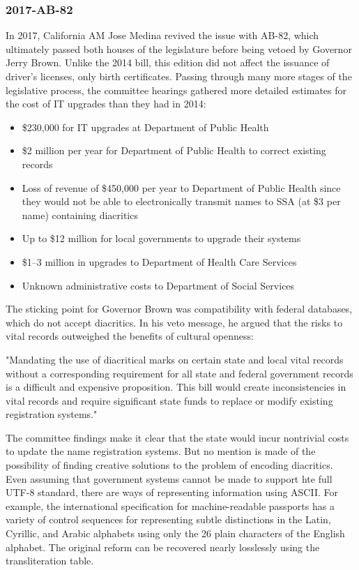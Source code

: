 \subsubsection{2017-AB-82}

In 2017, California AM Jose Medina revived the issue with AB-82, which
ultimately passed both houses of the legislature before being vetoed by
Governor Jerry Brown. Unlike the 2014 bill, this edition did not affect
the issuance of driver's licenses, only birth certificates. Passing
through many more stages of the legislative process, the committee
hearings gathered more detailed estimates for the cost of IT upgrades
than they had in 2014:

\begin{itemize}
\item
  \$230,000 for IT upgrades at Department of Public Health
\item
  \$2 million per year for Department of Public Health to correct
  existing records
\item
  Loss of revenue of \$450,000 per year to Department of Public Health
  since they would not be able to electronically transmit names to SSA
  (at \$3 per name) containing diacritics
\item
  Up to \$12 million for local governments to upgrade their systems
\item
  \$1--3 million in upgrades to Department of Health Care Services
\item
  Unknown administrative costs to Department of Social Services
\end{itemize}

The sticking point for Governor Brown was compatibility with federal databases,
which do not accept diacritics. In his veto message, he argued that the risks to
vital records outweighed the benefits of cultural openness:

"Mandating the use of diacritical marks on certain state and local vital records
without a corresponding requirement for all state and federal government records
is a difficult and expensive proposition.  This bill would create
inconsistencies in vital records and require significant state funds to replace
or modify existing registration systems."

The committee findings make it clear that the state would incur nontrivial costs
to update the name registration systems. But no mention is made of the
possibility of finding creative solutions to the problem of encoding diacritics.
Even assuming that government systems cannot be made to support hte full UTF-8
standard, there are ways of representing information using ASCII. For example,
the international specification for machine-readable passports has a variety of
control sequences for representing subtle distinctions in the Latin, Cyrillic,
and Arabic alphabets using only the 26 plain characters of the English alphabet.
The original reform can be recovered nearly losslessly using the transliteration
table.

